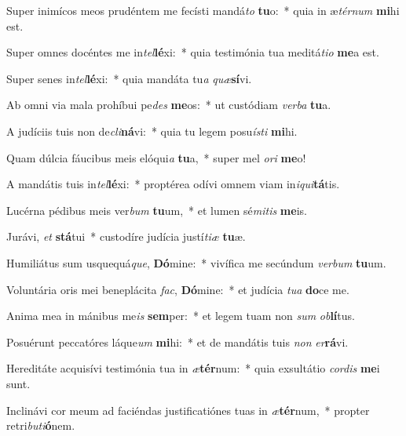 \item Super inimícos meos prudéntem me fecísti mandá\textit{to} \textbf{tu}o:~* quia in æ\textit{tér}\textit{num} \textbf{mi}hi est.
\item Super omnes docéntes me in\textit{tel}\textbf{lé}xi:~* quia testimónia tua meditá\textit{ti}\textit{o} \textbf{me}a est.
\item Super senes in\textit{tel}\textbf{lé}xi:~* quia mandáta tu\textit{a} \textit{quæ}\textbf{sí}vi.
\item Ab omni via mala prohíbui pe\textit{des} \textbf{me}os:~* ut custódiam \textit{ver}\textit{ba} \textbf{tu}a.
\item A judíciis tuis non de\textit{cli}\textbf{ná}vi:~* quia tu legem posu\textit{ís}\textit{ti} \textbf{mi}hi.
\item Quam dúlcia fáucibus meis elóqui\textit{a} \textbf{tu}a,~* super mel \textit{o}\textit{ri} \textbf{me}o!
\item A mandátis tuis in\textit{tel}\textbf{lé}xi:~* proptérea odívi omnem viam in\textit{i}\textit{qui}\textbf{tá}tis.
\item Lucérna pédibus meis ver\textit{bum} \textbf{tu}um,~* et lumen sé\textit{mi}\textit{tis} \textbf{me}is.
\item Jurávi, \textit{et} \textbf{stá}tui~* custodíre judícia justí\textit{ti}\textit{æ} \textbf{tu}æ.
\item Humiliátus sum usquequá\textit{que}, \textbf{Dó}mine:~* vivífica me secúndum \textit{ver}\textit{bum} \textbf{tu}um.
\item Voluntária oris mei beneplácita \textit{fac}, \textbf{Dó}mine:~* et judícia \textit{tu}\textit{a} \textbf{do}ce me.
\item Anima mea in mánibus me\textit{is} \textbf{sem}per:~* et legem tuam non \textit{sum} \textit{ob}\textbf{lí}tus.
\item Posuérunt peccatóres láque\textit{um} \textbf{mi}hi:~* et de mandátis tuis \textit{non} \textit{er}\textbf{rá}vi.
\item Hereditáte acquisívi testimónia tua in \textit{æ}\textbf{tér}num:~* quia exsultátio \textit{cor}\textit{dis} \textbf{me}i sunt.
\item Inclinávi cor meum ad faciéndas justificatiónes tuas in \textit{æ}\textbf{tér}num,~* propter retri\textit{bu}\textit{ti}\textbf{ó}nem.
